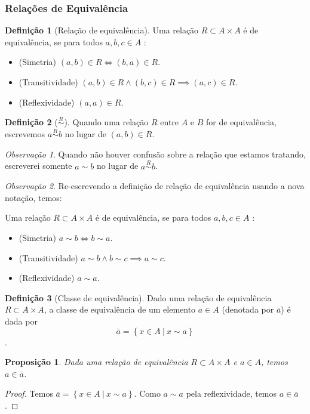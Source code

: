 \documentclass{article}
\newtheorem{prop}{Proposição}[section]
\theoremstyle{theorem}
\theoremstyle{lemma}
\theoremstyle{definition}
\newtheorem{definicao}{Definição}[section]
\theoremstyle{remark}
\newtheorem{obs}{Observação}[section]
\begin{document}
\subsubsection{Relações de Equivalência}
\begin{definicao}[Relação de equivalência]
	Uma relação $R \subset A \times A$ é de equivalência, se para todos $a,b,c \in A$ :
	\begin{itemize}
		\item (Simetria) $(a,b) \in R \iff  (b,a)\in R$.
		\item (Transitividade)  $(a,b)\in R \land (b,c)\in R \implies (a,c) \in R$.
		\item  (Reflexividade) $(a,a) \in R$.
	\end{itemize}
\end{definicao}
\begin{definicao}[$\overset{R}{\sim}$]
	Quando uma relação $R$ entre $A$ e $B$ for de equivalência, escrevemos $a\overset{R}{\sim} b$ no lugar de $(a,b) \in R$.
\end{definicao}
\begin{obs}
	Quando não houver confusão sobre a relação que estamos tratando, escreverei somente $a\sim b$ no lugar de $a\overset{R}{\sim} b$. 
\end{obs}
\begin{obs}

	Re-escrevendo a definição de relação de equivalência usando a nova notação, temos:

	Uma relação $R \subset A \times A$ é de equivalência, se para todos $a,b,c \in A$ :
	\begin{itemize}
		\item (Simetria) $a\sim b \iff  b \sim a$.
		\item (Transitividade)  $a \sim b \land b \sim c \implies a \sim c$.
		\item  (Reflexividade) $a \sim a$.
	\end{itemize}
\end{obs}
\begin{definicao}[Classe de equivalência]
	Dado uma relação de equivalência $R\subset A\times A$, a classe de equivalência de um elemento  $a\in A$ (denotada por $\bar{a}$) é dada por $$ \bar{a} = \left\{ x\in A \: | \: x\sim a \right\}$$.
\end{definicao}
\begin{prop}
	Dada uma relação de equivalência $R\subset A \times A$ e $a\in A$, temos $a\in \bar{a}$. 
\end{prop}
\begin{proof}
	Temos $\bar{a} = \left\{ x\in A \: | \: x\sim a \right\}$. Como $a\sim a$ pela reflexividade, temos $a\in \bar{a}$.
\end{proof}
\end{document}
